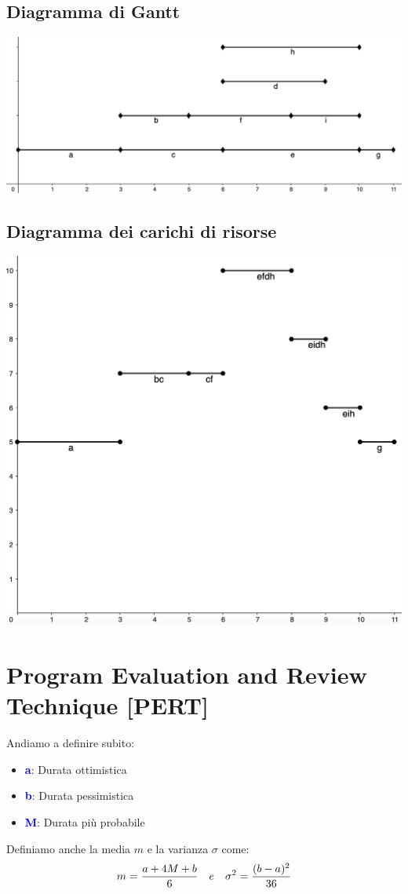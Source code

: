 \documentclass[12pt,a4paper]{article}
\begin{document}
\subsection{Diagramma di Gantt}
\begin{center}
\includegraphics[width=0.6\columnwidth]{img/diag_gantt.png}
\end{center}

\subsection{Diagramma dei carichi di risorse}
\begin{center}
\includegraphics[width=0.6\columnwidth]{img/diag_risorse.png}
\end{center}

\clearpage
\section{Program Evaluation and Review Technique [PERT]}
Andiamo a definire subito:
\begin{itemize}
\item \textcolor{blue}{\textbf{a}}: Durata ottimistica
\item \textcolor{blue}{\textbf{b}}: Durata pessimistica
\item \textcolor{blue}{\textbf{M}}: Durata più probabile
\end{itemize}
Definiamo anche la media $m$ e la varianza $\sigma$ come:
$$m={a+4M+b \over 6} \ \ \ e \ \ \ \sigma^2 = {(b-a)^2 \over 36}$$
\end{document}
